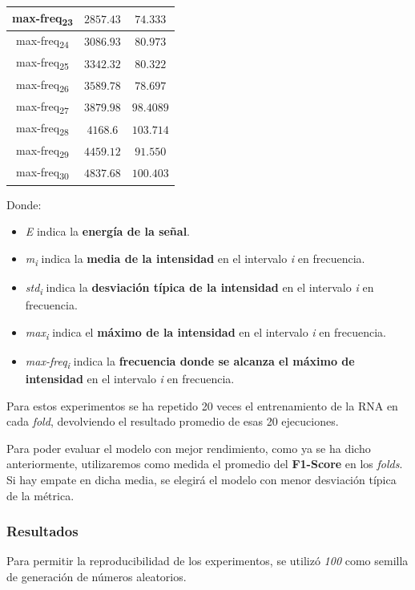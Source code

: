 \documentclass[12pt]{article}
\begin{document}
\begin{table}
\begin{tabular}{||c c c||}
			\hline
			max-freq\textsubscript{23} & $2857.43$ & $74.333$ \\
			\hline
			max-freq\textsubscript{24} & $3086.93$ & $80.973$ \\
			\hline
			max-freq\textsubscript{25} & $3342.32$ & $80.322$ \\
			\hline
			max-freq\textsubscript{26} & $3589.78$ & $78.697$ \\
			\hline
			max-freq\textsubscript{27} & $3879.98$ & $98.4089$ \\
			\hline
			max-freq\textsubscript{28} & $4168.6$ & $103.714$ \\
			\hline
			max-freq\textsubscript{29} & $4459.12$ & $91.550$ \\
			\hline
			max-freq\textsubscript{30} & $4837.68$ & $100.403$ \\
			\hline
		\end{tabular}
	\label{Tab:Features_3_4}
\end{table}

\newpage
\hphantom{skip}

Donde:
\begin{itemize}
	\item \textit{E} indica la \textbf{energía de la señal}.
	\item \textit{m\textsubscript{i}} indica la \textbf{media de la intensidad} en el intervalo \textit{i} en frecuencia.
	\item \textit{std\textsubscript{i}} indica la \textbf{desviación típica de la intensidad} en el intervalo \textit{i} en frecuencia.
	\item \textit{max\textsubscript{i}} indica el \textbf{máximo de la intensidad} en el intervalo \textit{i} en frecuencia.
	\item \textit{max-freq\textsubscript{i}} indica la \textbf{frecuencia donde se alcanza el máximo de intensidad} en el intervalo \textit{i} en frecuencia.
\end{itemize}
Para estos experimentos se ha repetido 20 veces el entrenamiento de la RNA en cada \textit{fold}, devolviendo el resultado promedio de esas 20 ejecuciones.

\bigskip
Para poder evaluar el modelo con mejor rendimiento, como ya se ha dicho anteriormente, utilizaremos como medida el promedio
del \textbf{F1-Score} en los \textit{folds}. Si hay empate en dicha media, se elegirá el modelo con menor
desviación típica de la métrica.

\subsubsection{Resultados}
Para permitir la reproducibilidad de los experimentos, se utilizó \textit{100} como semilla de generación de números
aleatorios.
\end{document}

